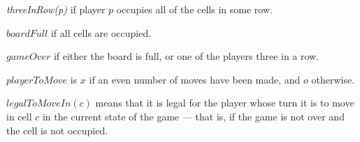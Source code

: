 \documentclass{led_doc}
\begin{document}
\begin{ledCmnt}
{\em threeInRow(p)} if player $p$ occupies all of the cells in some row.
\end{ledCmnt}

\begin{ledDef}
\end{ledDef}

\begin{ledCmnt}
$boardFull$ if all cells are occupied.
\end{ledCmnt}

\begin{ledDef}
\end{ledDef}

\begin{ledCmnt}
$gameOver$ if either the board is full, or one of the players three in a row.
\end{ledCmnt}

\begin{ledDef}
\end{ledDef}

\begin{ledCmnt}
$playerToMove$ is $x$ if an even number of moves have been made, and $o$ otherwise.
\end{ledCmnt}

\begin{ledDef}
\end{ledDef}

\begin{ledDef}
\end{ledDef}

\begin{ledCmnt}
$legalToMoveIn(c)$ means that it is legal for the player whose
turn it is to move in cell $c$ in the current state of the game ---
that is, if the game is not over and the cell is not occupied.
\end{ledCmnt}

\begin{ledDef}
\end{ledDef}
\end{document}

